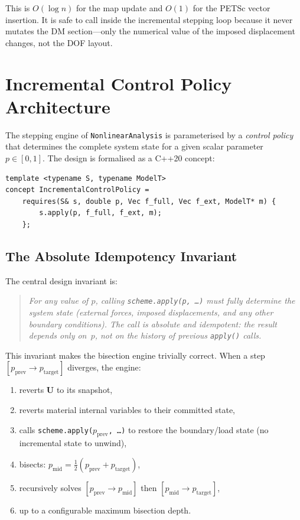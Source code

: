 This is $O(\log n)$ for the map update and $O(1)$ for the PETSc vector
insertion.  It is safe to call inside the incremental stepping loop
because it never mutates the DM section---only the numerical value of the
imposed displacement changes, not the DOF layout.


\section{Incremental Control Policy Architecture}
\label{sec:incremental-control}

The stepping engine of \texttt{NonlinearAnalysis} is parameterised by a
\emph{control policy} that determines the complete system state for a
given scalar parameter~$p \in [0,1]$.  The design is formalised as a
C++20 concept:

\begin{lstlisting}
template <typename S, typename ModelT>
concept IncrementalControlPolicy =
    requires(S& s, double p, Vec f_full, Vec f_ext, ModelT* m) {
        s.apply(p, f_full, f_ext, m);
    };
\end{lstlisting}

\subsection{The Absolute Idempotency Invariant}
\label{ssec:idempotency}

The central design invariant is:

\begin{quote}
\itshape
For any value of $p$, calling \texttt{scheme.apply(p, \ldots)} must
fully determine the system state (external forces, imposed
displacements, and any other boundary conditions).
The call is \emph{absolute} and \emph{idempotent}: the result depends
only on~$p$, not on the history of previous \texttt{apply()} calls.
\end{quote}

This invariant makes the bisection engine trivially correct.  When a step
$[p_{\text{prev}} \to p_{\text{target}}]$ diverges, the engine:
\begin{enumerate}
  \item reverts $\mathbf{U}$ to its snapshot,
  \item reverts material internal variables to their committed state,
  \item calls \texttt{scheme.apply($p_{\text{prev}}$, \ldots)} to
    restore the boundary/load state (no incremental state to unwind),
  \item bisects:
    $p_{\text{mid}} = \tfrac{1}{2}(p_{\text{prev}} + p_{\text{target}})$,
  \item recursively solves
    $[p_{\text{prev}} \to p_{\text{mid}}]$ then
    $[p_{\text{mid}} \to p_{\text{target}}]$,
  \item up to a configurable maximum bisection depth.
\end{enumerate}

